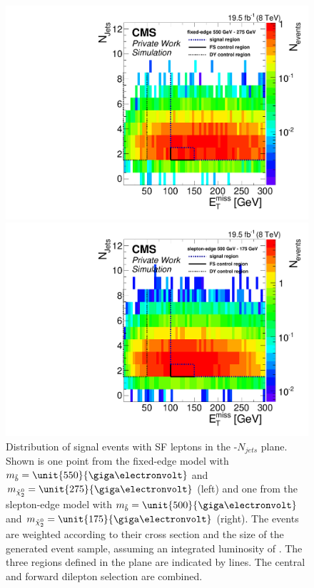 \begin{figure}[htbp]
\centering
\begin{minipage}[t]{0.49\textwidth}
  \includegraphics[width=\textwidth]{plots/SELECTION/metJetsScatter_SUSY_edge_550_275.pdf}
\end{minipage}
\begin{minipage}[t]{0.49\textwidth}
\includegraphics[width=\textwidth]{plots/SELECTION/metJetsScatter_SUSY_slepton_500_175.pdf}
\end{minipage}
\caption{Distribution of signal events with SF leptons in the \MET-$N_{jets}$ plane. Shown is one point from the fixed-edge model with $m_{\sbottom} = \unit{550}{\giga\electronvolt}$ and $m_{\secondchi} = \unit{275}{\giga\electronvolt}$ (left) and one from the slepton-edge model with $m_{\sbottom} = \unit{500}{\giga\electronvolt}$ and $m_{\secondchi} = \unit{175}{\giga\electronvolt}$ (right). The events are weighted according to their cross section and the size of the generated event sample, assuming an integrated luminosity of \lumi. The three regions defined in the plane are indicated by lines. The central and forward dilepton selection are combined.}
\label{fig:sigRegionSignal}
\end{figure}    

